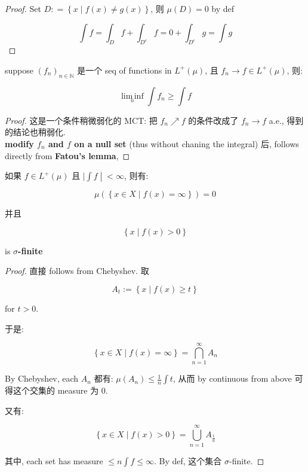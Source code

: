 \begin{proof}

Set \(D: = \left\{ {x \mid f(x) \neq g(x)} \right\}\), 则 \(\mu(D) = 0\) by def

\[\int f = \int_{D}f + \int_{D^{c}}f = 0 + \int_{D^{c}}g = \int g\]

\end{proof}

\begin{corollary}{}

suppose \((f_{n})_{n \in \mathbb{N}}\) 是一个 seq of functions in \(L^{+}(\mu)\), 且 \(f_{n}\rightarrow f \in L^{+}(\mu)\), 则:

\[\operatorname{lim\, inf}\limits_{n}\int f_{n} \geq \int f\]

\end{corollary}

\begin{proof}

这是一个条件稍微弱化的 MCT: 把 \(f_{n}\operatorname{\nearrow }f\) 的条件改成了 \(f_{n}\rightarrow f\) a.e., 得到的结论也稍弱化.\\
\textbf{modify \(f_{n}\) and \(f\) on a null set} (thus without chaning the integral) 后, follows directly from \textbf{Fatou's lemma},

\end{proof}

\begin{theorem}{}

如果 \(f \in L^{+}(\mu)\) 且 \(\left. |\int f \middle| < \infty \right.\), 则有:

\[\mu(\left\{ {x \in X \mid f(x) = \infty} \right\}) = 0\]

并且

\[\left\{ {x \mid f(x) > 0} \right\}\]

is \textbf{\(\sigma\)-finite}

\end{theorem}

\begin{proof}

直接 follows from Chebyshev. 取

\[A_{t} := \left\{ {x \mid f(x) \geq t} \right\}\]

for \(t > 0\).

于是:

\[\left\{ {x \in X \mid f(x) = \infty} \right\} = \bigcap\limits_{n = 1}^{\infty}A_{n}\]

By Chebyshev, each \(A_{n}\) 都有: \(\mu(A_{n}) \leq \frac{1}{n}\int t\), 从而 by continuous from above 可得这个交集的 measure 为 0.

又有:

\[\left\{ {x \in X \mid f(x) > 0} \right\} = \bigcup\limits_{n = 1}^{\infty}A_{\frac{1}{n}}\]

其中, each set has measure \(\leq n\int f \leq \infty\). By def, 这个集合 \(\sigma\)-finite.

\end{proof}
